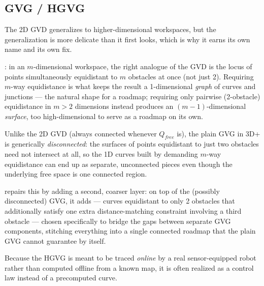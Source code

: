 \subsection{GVG / HGVG}
The 2D GVD generalizes to higher-dimensional workspaces, but the generalization is more delicate than it first looks, which is why it earns its own name and its own fix.

: in an $m$-dimensional workspace, the right analogue of the GVD is the locus of points simultaneously equidistant to $m$ obstacles at once (not just 2). Requiring $m$-way equidistance is what keeps the result a 1-dimensional \emph{graph} of curves and junctions --- the natural shape for a roadmap; requiring only pairwise (2-obstacle) equidistance in $m>2$ dimensions instead produces an $(m-1)$-dimensional \emph{surface}, too high-dimensional to serve as a roadmap on its own.

\begin{notebox}
Unlike the 2D GVD (always connected whenever $Q_{free}$ is), the plain GVG in 3D+ is generically \emph{disconnected}: the surfaces of points equidistant to just two obstacles need not intersect at all, so the 1D curves built by demanding $m$-way equidistance can end up as separate, unconnected pieces even though the underlying free space is one connected region.
\end{notebox}


 repairs this by adding a second, coarser layer: on top of the (possibly disconnected) GVG, it adds  --- curves equidistant to only 2 obstacles that additionally satisfy one extra distance-matching constraint involving a third obstacle --- chosen specifically to bridge the gaps between separate GVG components, stitching everything into a single connected roadmap that the plain GVG cannot guarantee by itself.

Because the HGVG is meant to be traced \emph{online} by a real sensor-equipped robot rather than computed offline from a known map, it is often realized as a control law instead of a precomputed curve.


